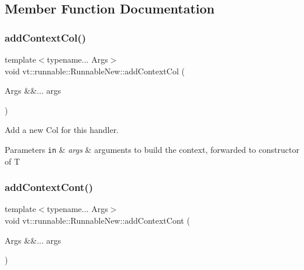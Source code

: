 \subsection{Member Function Documentation}
\mbox{\label{structvt_1_1runnable_1_1_runnable_new_aa9c078712f8f2321bd247ffbccc8049a}} 
\subsubsection{\texorpdfstring{add\+Context\+Col()}{addContextCol()}}
{\footnotesize\ttfamily template$<$typename... Args$>$ \\
void vt\+::runnable\+::\+Runnable\+New\+::add\+Context\+Col (\begin{DoxyParamCaption}\item[{Args \&\&...}]{args }\end{DoxyParamCaption})}



Add a new {\ttfamily Col} for this handler. 


\begin{DoxyParams}[1]{Parameters}
\mbox{\tt in}  & {\em args} & arguments to build the context, forwarded to constructor of {\ttfamily T} \\
\hline
\end{DoxyParams}
\mbox{\label{structvt_1_1runnable_1_1_runnable_new_a0c551ef0da74a3b29028e390a5e15400}} 
\subsubsection{\texorpdfstring{add\+Context\+Cont()}{addContextCont()}}
{\footnotesize\ttfamily template$<$typename... Args$>$ \\
void vt\+::runnable\+::\+Runnable\+New\+::add\+Context\+Cont (\begin{DoxyParamCaption}\item[{Args \&\&...}]{args }\end{DoxyParamCaption})}



